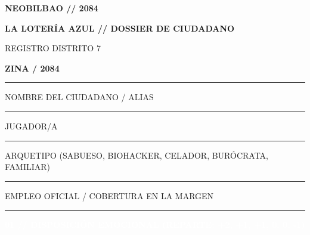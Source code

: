 \documentclass[10pt,a4paper,oneside]{book}
\newcommand{\field}[2][\linewidth]{%
  \begin{minipage}[t]{#1}
  \textcolor{InkSoft}{\terminalfont\scriptsize\MakeUppercase{#2}}\par
  \vspace{1mm}\textcolor{Line}{\rule{\linewidth}{0.45pt}}
  \end{minipage}}
\newcommand{\strip}[1]{%
  \vspace{0.8mm}\noindent
  \colorbox{CarbonDark}{\parbox{\dimexpr\linewidth-2\fboxsep\relax}{%
    \textcolor{white}{\industrialfont\bfseries\small\MakeUppercase{#1}}}}\par
  \vspace{0.8mm}}
\begin{document}
\pagecolor{Paper}

\noindent
\begin{minipage}[c]{0.68\linewidth}
  {\industrialfont\bfseries\fontsize{22}{23}\selectfont\color{CarbonDark}NEOBILBAO // 2084}\par
  \vspace{0.5mm}
  {\industrialfont\bfseries\small\color{UrdinLoteria}LA LOTERÍA AZUL \textcolor{OrekakRust}{//} DOSSIER DE CIUDADANO}
\end{minipage}%
\hfill
\begin{minipage}[c]{0.28\linewidth}
  \raggedleft
  {\terminalfont\scriptsize\color{InkSoft}REGISTRO DISTRITO 7}\par
  {\industrialfont\bfseries\large\color{OrekakRust}ZINA / 2084}
\end{minipage}

\vspace{1mm}
\textcolor{UrdinLoteria}{\rule{\linewidth}{1.2pt}}
\vspace{1mm}

\begin{minipage}[t]{0.58\linewidth}
  \field{Nombre del ciudadano / alias}
\end{minipage}\hfill
\begin{minipage}[t]{0.38\linewidth}
  \field{Jugador/a}
\end{minipage}

\vspace{0.5mm}
\begin{minipage}[t]{0.58\linewidth}
  \field{Arquetipo (Sabueso, Biohacker, Celador, Burócrata, Familiar)}
\end{minipage}\hfill
\begin{minipage}[t]{0.38\linewidth}
  \field{Empleo oficial / Cobertura en La Margen}
\end{minipage}

\strip{01 // Disposición emocional (reparte: +2, +1, +1, 0, 0, -1)}
\end{document}
